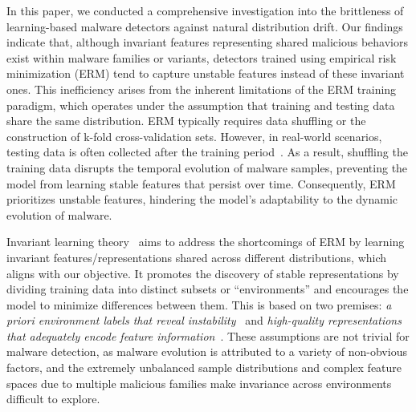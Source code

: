 
In this paper, we conducted a comprehensive investigation into the brittleness of learning-based malware detectors against natural distribution drift. Our findings indicate that, although invariant features representing shared malicious behaviors exist within malware families or variants, detectors trained using empirical risk minimization (ERM) tend to capture unstable features instead of these invariant ones. This inefficiency arises from the inherent limitations of the ERM training paradigm, which operates under the assumption that training and testing data share the same distribution. ERM typically requires data shuffling or the construction of k-fold cross-validation sets. However, in real-world scenarios, testing data is often collected after the training period~\cite{tesseract}. As a result, shuffling the training data disrupts the temporal evolution of malware samples, preventing the model from learning stable features that persist over time. Consequently, ERM prioritizes unstable features, hindering the model's adaptability to the dynamic evolution of malware.

%

Invariant learning theory~\cite{IR_intro} aims to address the shortcomings of ERM by learning invariant features/representations shared across different distributions, which aligns with our objective. It promotes the discovery of stable representations by dividing training data into distinct subsets or ``environments'' and encourages the model to minimize differences between them. This is based on two premises: \emph{a priori environment labels that reveal instability}~\cite{environment_label, env_label} and \emph{high-quality representations that adequately encode feature information}~\cite{yang2024invariant}. These assumptions are not trivial for malware detection, as malware evolution is attributed to a variety of non-obvious factors, and the extremely unbalanced sample distributions and complex feature spaces due to multiple malicious families make invariance across environments difficult to explore.




